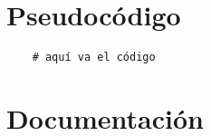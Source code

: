 \documentclass[a4paper,12pt]{article}
\begin{document}
\section{Pseudocódigo}

\begin{verbatim}
    # aquí va el código 
\end{verbatim}









\section{Documentación}





\newpage %
\thispagestyle{fancyref}
\printbibliography %
\end{document}
